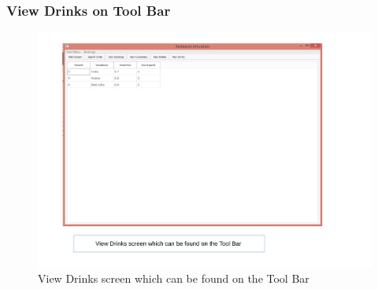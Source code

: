 \begin{landscape}
\subsubsection{View Drinks on Tool Bar}
\begin{figure}[H]
    \includegraphics[width = 15cm]{./Maintenance/images/screen21}
    \caption{View Drinks screen which can be found on the Tool Bar} \label{fig:screen21}
\end{figure}
\end{landscape}

